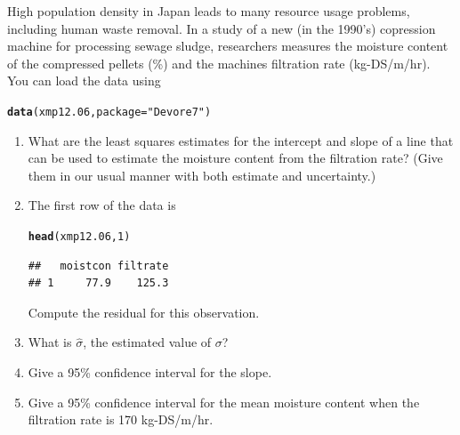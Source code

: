 \documentclass[twoside]{book}\usepackage[]{graphicx}\usepackage[]{xcolor}
\makeatletter
\newcommand{\hlnum}[1]{\textcolor[rgb]{0.686,0.059,0.569}{#1}}%
\newcommand{\hlstr}[1]{\textcolor[rgb]{0.192,0.494,0.8}{#1}}%
\newcommand{\hlstd}[1]{\textcolor[rgb]{0.345,0.345,0.345}{#1}}%
\newcommand{\hlkwc}[1]{\textcolor[rgb]{0.333,0.667,0.333}{#1}}%
\newcommand{\hlkwd}[1]{\textcolor[rgb]{0.737,0.353,0.396}{\textbf{#1}}}%
\newenvironment{kframe}{%
 \def\at@end@of@kframe{}%
 \ifinner\ifhmode%
  \def\at@end@of@kframe{\end{minipage}}%
  \begin{minipage}{\columnwidth}%
 \fi\fi%
 \def\FrameCommand##1{\hskip\@totalleftmargin \hskip-\fboxsep
 \colorbox{shadecolor}{##1}\hskip-\fboxsep
     \hskip-\linewidth \hskip-\@totalleftmargin \hskip\columnwidth}%
 \MakeFramed {\advance\hsize-\width
   \@totalleftmargin\z@ \linewidth\hsize
   \@setminipage}}%
 {\par\unskip\endMakeFramed%
 \at@end@of@kframe}
\newenvironment{knitrout}{}{} %
\makeatother
\begin{document}
\begin{problem}
High population density in Japan leads to many resource usage problems, including
human waste removal.  In a study of a new (in the 1990's) copression machine for 
processing sewage sludge, researchers measures the moisture content of the 
compressed pellets (\%) and the machines filtration rate (kg-DS/m/hr).
You can load the data using
\begin{knitrout}
\color{fgcolor}\begin{kframe}
\begin{alltt}
\hlkwd{data}\hlstd{(xmp12.06,} \hlkwc{package} \hlstd{=} \hlstr{"Devore7"}\hlstd{)}
\end{alltt}
\end{kframe}
\end{knitrout}

\begin{enumerate}
	\item What are the least squares estimates for the intercept and slope of a line
		that can be used to estimate the moisture content from the filtration rate?
		(Give them in our usual manner with both estimate and uncertainty.)
	\item
		The first row of the data is
\begin{knitrout}
\color{fgcolor}\begin{kframe}
\begin{alltt}
\hlkwd{head}\hlstd{(xmp12.06,} \hlnum{1}\hlstd{)}
\end{alltt}
\begin{verbatim}
##   moistcon filtrate
## 1     77.9    125.3
\end{verbatim}
\end{kframe}
\end{knitrout}
\noindent
Compute the residual for this observation.
	\item
		What is $\hat \sigma$, the estimated value of $\sigma$?
	\item
		Give a 95\% confidence interval for the slope.
	\item
		Give a 95\% confidence interval for the mean moisture content
		when the filtration rate is 170 kg-DS/m/hr.
\end{enumerate}
\end{problem}
\end{document}
